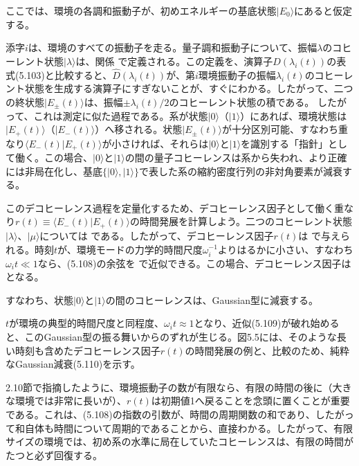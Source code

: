 ここでは、環境の各調和振動子が、初めエネルギーの基底状態$|E_0\rangle$にあると仮定する。

\hypertarget{srcpage:212}{}\label{srcpage:212}
添字$i$は、環境のすべての振動子を走る。量子調和振動子について、振幅$\lambda$のコヒーレント状態$|\lambda\rangle$は、関係\cite{ref238,ref239,ref240,ref241}
で定義される。この定義を、演算子$\hat D(\lambda_i(t))$の表式(5.103)と比較すると、$\hat D(\lambda_i(t))$が、第$i$環境振動子の振幅$\lambda_i(t)$のコヒーレント状態を生成する演算子にすぎないことが、すぐにわかる。したがって、二つの終状態$|E_{\pm}(t)\rangle$は、振幅$\pm\lambda_i(t)/2$のコヒーレント状態の積である。
したがって、これは測定に似た過程である。系が状態$|0\rangle$（$|1\rangle$）にあれば、環境状態は$|E_+(t)\rangle$（$|E_-(t)\rangle$）へ移される。状態$|E_{\pm}(t)\rangle$が十分区別可能、すなわち重なり$\langle E_-(t)|E_+(t)\rangle$が小さければ、それらは$|0\rangle$と$|1\rangle$を識別する「指針」として働く。この場合、$|0\rangle$と$|1\rangle$の間の量子コヒーレンスは系から失われ、より正確には非局在化し、基底$\{|0\rangle,|1\rangle\}$で表した系の縮約密度行列の非対角要素が減衰する。

このデコヒーレンス過程を定量化するため、デコヒーレンス因子として働く重なり$r(t)\equiv\langle E_-(t)|E_+(t)\rangle$の時間発展を計算しよう。二つのコヒーレント状態$|\lambda\rangle$、$|\mu\rangle$については
である。したがって、デコヒーレンス因子$r(t)$は
で与えられる。時刻$t$が、環境モードの力学的時間尺度$\omega_i^{-1}$よりはるかに小さい、すなわち$\omega_it\ll1$なら、(5.108)の余弦を
で近似できる。この場合、デコヒーレンス因子は
となる。

\hypertarget{srcpage:213}{}\label{srcpage:213}
すなわち、状態$|0\rangle$と$|1\rangle$の間のコヒーレンスは、Gaussian型に減衰する。

$t$が環境の典型的時間尺度と同程度、$\omega_it\approx1$となり、近似(5.109)が破れ始めると、このGaussian型の振る舞いからのずれが生じる。図5.5には、そのような長い時刻も含めたデコヒーレンス因子$r(t)$の時間発展の例と、比較のため、純粋なGaussian減衰(5.110)を示す。

2.10節で指摘したように、環境振動子の数が有限なら、有限の時間の後に（大きな環境では非常に長いが）、$r(t)$は初期値1へ戻ることを念頭に置くことが重要である。これは、(5.108)の指数の引数が、時間の周期関数の和であり、したがって和自体も時間について周期的であることから、直接わかる。したがって、有限サイズの環境では、初め系の水準に局在していたコヒーレンスは、有限の時間がたつと必ず回復する。

